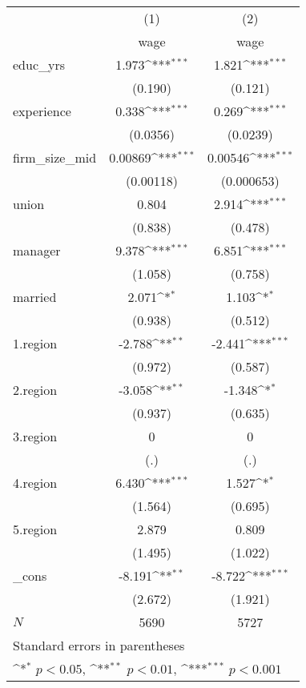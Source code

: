 {
\def\sym#1{\ifmmode^{#1}\else\(^{#1}\)\fi}
\begin{tabular}{l*{2}{c}}
\hline\hline
            &\multicolumn{1}{c}{(1)}&\multicolumn{1}{c}{(2)}\\
            &\multicolumn{1}{c}{wage}&\multicolumn{1}{c}{wage}\\
\hline
educ\_yrs    &       1.973\sym{***}&       1.821\sym{***}\\
            &     (0.190)         &     (0.121)         \\
[1em]
experience  &       0.338\sym{***}&       0.269\sym{***}\\
            &    (0.0356)         &    (0.0239)         \\
[1em]
firm\_size\_mid&     0.00869\sym{***}&     0.00546\sym{***}\\
            &   (0.00118)         &  (0.000653)         \\
[1em]
union       &       0.804         &       2.914\sym{***}\\
            &     (0.838)         &     (0.478)         \\
[1em]
manager     &       9.378\sym{***}&       6.851\sym{***}\\
            &     (1.058)         &     (0.758)         \\
[1em]
married     &       2.071\sym{*}  &       1.103\sym{*}  \\
            &     (0.938)         &     (0.512)         \\
[1em]
1.region    &      -2.788\sym{**} &      -2.441\sym{***}\\
            &     (0.972)         &     (0.587)         \\
[1em]
2.region    &      -3.058\sym{**} &      -1.348\sym{*}  \\
            &     (0.937)         &     (0.635)         \\
[1em]
3.region    &           0         &           0         \\
            &         (.)         &         (.)         \\
[1em]
4.region    &       6.430\sym{***}&       1.527\sym{*}  \\
            &     (1.564)         &     (0.695)         \\
[1em]
5.region    &       2.879         &       0.809         \\
            &     (1.495)         &     (1.022)         \\
[1em]
\_cons      &      -8.191\sym{**} &      -8.722\sym{***}\\
            &     (2.672)         &     (1.921)         \\
\hline
\(N\)       &        5690         &        5727         \\
\hline\hline
\multicolumn{3}{l}{\footnotesize Standard errors in parentheses}\\
\multicolumn{3}{l}{\footnotesize \sym{*} \(p<0.05\), \sym{**} \(p<0.01\), \sym{***} \(p<0.001\)}\\
\end{tabular}
}
